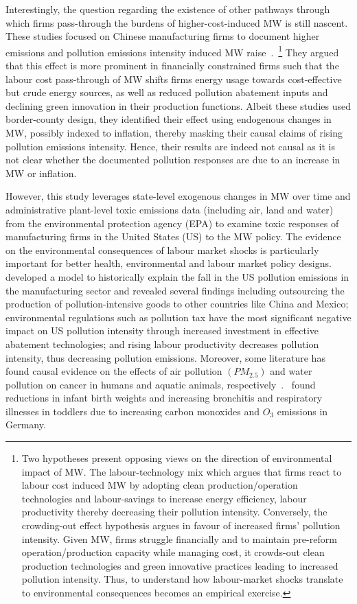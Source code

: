 \documentclass[12pt, english]{article}
\begin{document}
    Interestingly, the question regarding the existence of other pathways through which firms pass-through the burdens of higher-cost-induced MW is still nascent. These studies focused on Chinese manufacturing firms to document higher emissions and pollution emissions intensity induced MW raise~\parencite{li2023does, zhang2023unintended}.~\footnote{\tiny Two hypotheses present opposing views on the direction of environmental impact of MW. The labour-technology mix which argues that firms react to labour cost induced MW by adopting clean production/operation technologies and labour-savings to increase energy efficiency, labour productivity thereby decreasing their pollution intensity. Conversely, the crowding-out effect hypothesis argues in favour of increased firms' pollution intensity. Given MW, firms struggle financially and to maintain pre-reform operation/production capacity while managing cost, it crowds-out clean production technologies and green innovative practices leading to increased pollution intensity. Thus, to understand how labour-market shocks translate to environmental consequences becomes an empirical exercise.} They argued that this effect is more prominent in financially constrained firms such that the labour cost pass-through of MW shifts firms energy usage towards cost-effective but crude energy sources, as well as reduced pollution abatement inputs and declining green innovation in their production functions. Albeit these studies used border-county design, they identified their effect using endogenous changes in MW, possibly indexed to inflation, thereby masking their causal claims of rising pollution emissions intensity. Hence, their results are indeed not causal as it is not clear whether the documented pollution responses are due to an increase in MW or inflation.

    However, this study leverages state-level exogenous changes in MW over time and administrative plant-level toxic emissions data (including air, land and water) from the environmental protection agency (EPA) to examine toxic responses of manufacturing firms in the United States (US) to the MW policy. The evidence on the environmental consequences of labour market shocks is particularly important for better health, environmental and labour market policy designs.~\cite{shapiro2018pollution} developed a model to historically explain the fall in the US pollution emissions in the manufacturing sector and revealed several findings including outsourcing the production of pollution-intensive goods to other countries like China and Mexico; environmental regulations such as pollution tax have the most significant negative impact on US pollution intensity through increased investment in effective abatement technologies; and rising labour productivity decreases pollution intensity, thus decreasing pollution emissions. Moreover, some literature has found causal evidence on the effects of air pollution $(PM_{2.5})$ and water pollution on cancer in humans and aquatic animals, respectively~\parencite{turner2020outdoor, turner2017ambient, baines2021linking}.~\cite{coneus2012pollution} found reductions in infant birth weights and increasing bronchitis and respiratory illnesses in toddlers due to increasing carbon monoxides and $O_{3}$ emissions in Germany.
\end{document}

